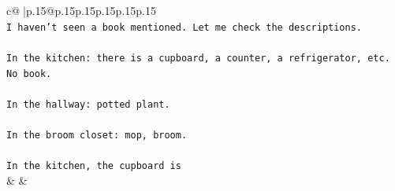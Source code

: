 \documentclass{article}
\begin{document}
{\begin{supertabular}{c@{$\;$}|p{.15\linewidth}@{}p{.15\linewidth}p{.15\linewidth}p{.15\linewidth}p{.15\linewidth}p{.15\linewidth}}
{{{\\ 
\texttt{I haven't seen a book mentioned. Let me check the descriptions.} \\
\\ 
\texttt{In the kitchen: there is a cupboard, a counter, a refrigerator, etc. No book.} \\
\\ 
\texttt{In the hallway: potted plant.} \\
\\ 
\texttt{In the broom closet: mop, broom.} \\
\\ 
\texttt{In the kitchen, the cupboard is} \\
            }
        }
    }
    & & \\ \\


\end{supertabular}}
\end{document}

